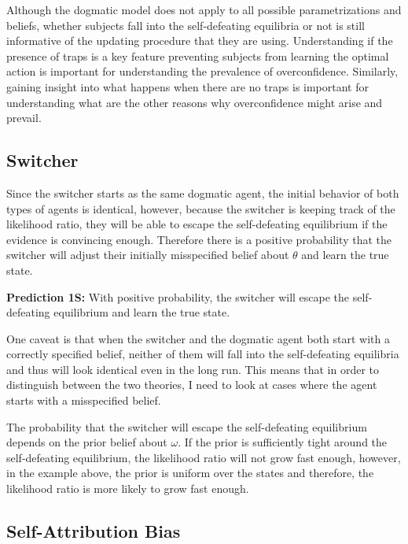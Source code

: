 \documentclass[
  12pt,
]{article}
\begin{document}
Although the dogmatic model does not apply to all possible
parametrizations and beliefs, whether subjects fall into the
self-defeating equilibria or not is still informative of the updating
procedure that they are using. Understanding if the presence of traps is
a key feature preventing subjects from learning the optimal action is
important for understanding the prevalence of overconfidence. Similarly,
gaining insight into what happens when there are no traps is important
for understanding what are the other reasons why overconfidence might
arise and prevail.

\hypertarget{switcher}{%
\subsection{Switcher}\label{switcher}}

Since the switcher starts as the same dogmatic agent, the initial
behavior of both types of agents is identical, however, because the
switcher is keeping track of the likelihood ratio, they will be able to
escape the self-defeating equilibrium if the evidence is convincing
enough. Therefore there is a positive probability that the switcher will
adjust their initially misspecified belief about \(\theta\) and learn
the true state.

\textbf{Prediction 1S:} With positive probability, the switcher will
escape the self-defeating equilibrium and learn the true state.

One caveat is that when the switcher and the dogmatic agent both start
with a correctly specified belief, neither of them will fall into the
self-defeating equilibria and thus will look identical even in the long
run. This means that in order to distinguish between the two theories, I
need to look at cases where the agent starts with a misspecified belief.

The probability that the switcher will escape the self-defeating
equilibrium depends on the prior belief about \(\omega\). If the prior
is sufficiently tight around the self-defeating equilibrium, the
likelihood ratio will not grow fast enough, however, in the example
above, the prior is uniform over the states and therefore, the
likelihood ratio is more likely to grow fast enough.

\hypertarget{self-attribution-bias}{%
\subsection{Self-Attribution Bias}\label{self-attribution-bias}}
\end{document}
